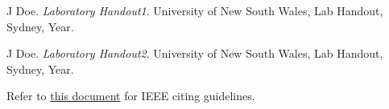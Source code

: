 \begin{thebibliography}{9}
    J Doe.
    \textit{Laboratory Handout1}. 
    University of New South Wales, Lab Handout, Sydney, Year.

    J Doe.
    \textit{Laboratory Handout2}. 
    University of New South Wales, Lab Handout, Sydney, Year.
 \end{thebibliography}

 Refer to \href{https://www.google.com/url?sa=t&rct=j&q=&esrc=s&source=web&cd=&cad=rja&uact=8&ved=2ahUKEwjr1q_b0IzqAhVGbn0KHWkRDKAQFjABegQIDBAD&url=https%3A%2F%2Fieee-dataport.org%2Fsites%2Fdefault%2Ffiles%2Fanalysis%2F27%2FIEEE%2520Citation%2520Guidelines.pdf&usg=AOvVaw3WqzISVFjuCBM0Ti22r3oc}{this document} for IEEE citing guidelines.
